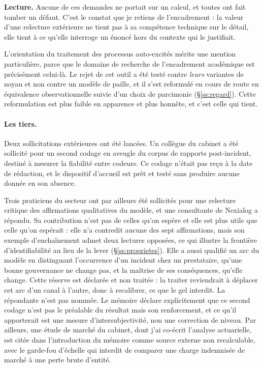 \documentclass[12pt,a4paper]{article}
\theoremstyle{definition}
\begin{document}
\textbf{Lecture.} Aucune de ces demandes ne portait sur un calcul, et toutes ont
fait tomber un défaut. C'est le constat que je retiens de l'encadrement : la valeur
d'une relecture extérieure ne tient pas à sa compétence technique sur le détail,
elle tient à ce qu'elle interroge un énoncé hors du contexte qui le justifiait.

L'orientation du traitement des processus auto-excités mérite une mention
particulière, parce que le domaine de recherche de l'encadrement académique est
précisément celui-là. Le rejet de cet outil a été testé contre \emph{leurs}
variantes de noyau et non contre un modèle de paille, et il s'est reformulé en
cours de route en équivalence observationnelle suivie d'un choix de parcimonie
(\S\ref{ss:regard}). Cette reformulation est plus faible en apparence et plus
honnête, et c'est celle qui tient.

\paragraph{Les tiers.} Deux sollicitations extérieures ont été lancées. Un collègue
du cabinet a été sollicité pour un second codage en aveugle du corpus de rapports
post-incident, destiné à mesurer la fiabilité entre codeurs. Ce codage n'était pas
reçu à la date de rédaction, et le dispositif d'accueil est prêt et testé sans
produire aucune donnée en son absence.

Trois praticiens du secteur ont par ailleurs été sollicités pour une relecture
critique des affirmations qualitatives du modèle, et une consultante de Nexialog a
répondu. Sa contribution n'est pas de celles qu'on espère et elle est plus utile
que celle qu'on espérait : elle n'a contredit aucune des sept affirmations, mais
son exemple d'enchaînement admet deux lectures opposées, ce qui illustre la
frontière d'identifiabilité au lieu de la lever (\S\ref{ss:proprietes}). Elle a
aussi qualifié un arc du modèle en distinguant l'occurrence d'un incident chez un
prestataire, qu'une bonne gouvernance ne change pas, et la maîtrise de ses
conséquences, qu'elle change. Cette réserve est déclarée et non traitée : la
traiter reviendrait à déplacer cet arc d'un canal à l'autre, donc à recalibrer, ce
que le gel interdit. La répondante n'est pas nommée. Le mémoire
déclare explicitement que ce second codage n'est pas le préalable du résultat mais
son renforcement, et ce qu'il apporterait est une mesure d'intersubjectivité, non
une correction de niveau. Par ailleurs, une étude de marché du cabinet, dont j'ai
co-écrit l'analyse actuarielle, est citée dans l'introduction du mémoire comme
source externe non recalculable, avec le garde-fou d'échelle qui interdit de
comparer une charge indemnisée de marché à une perte brute d'entité.
\end{document}
